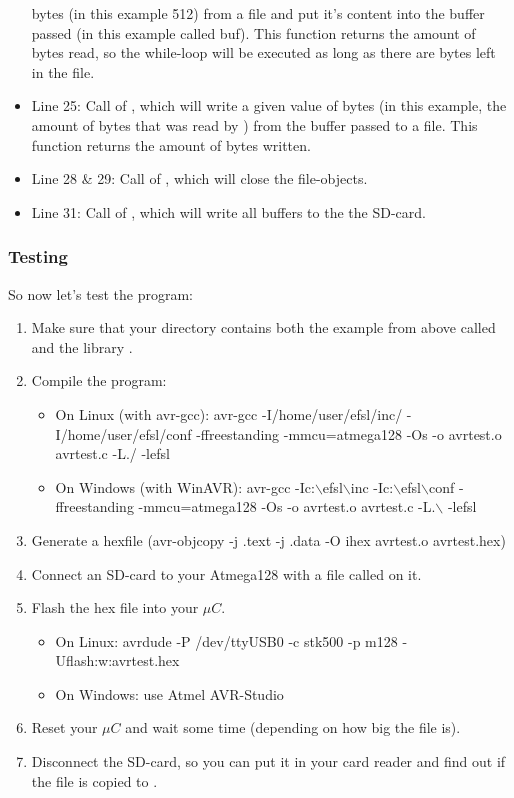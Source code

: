 \begin{itemize}
{		bytes (in this example 512) from a file and put it's content into
		the buffer passed (in this example called buf). This function returns
		the amount of bytes read, so the while-loop will be executed as long
		as there are bytes left in the file.}
	\item{Line 25: Call of , which will write a given value
		of bytes (in this example, the amount of bytes that was read
		by ) from the buffer passed to a file. This function returns
		the amount of bytes written.}
	\item{Line 28 \& 29: Call of , which will close the
		file-objects.}
	\item{Line 31: Call of , which will write all buffers to
		the the SD-card.}
\end{itemize}
\subsubsection{Testing}
So now let's test the program:
\begin{enumerate}
	\item
	{
		Make sure that your directory contains both the example from above
		called  and the library .
	}
	\item
	{	Compile the program:
		\begin{itemize}
			\item{On Linux (with avr-gcc): avr-gcc -I/home/user/efsl/inc/
				-I/home/user/efsl/conf -ffreestanding -mmcu=atmega128 -Os -o
				avrtest.o avrtest.c -L./ -lefsl}
			\item{On Windows (with WinAVR): avr-gcc
				-Ic:$\backslash$efsl$\backslash$inc
				-Ic:$\backslash$efsl$\backslash$conf
				-ffreestanding -mmcu=atmega128 -Os -o
				avrtest.o avrtest.c -L.$\backslash$ -lefsl}
		\end{itemize}
	}
	\item{Generate a hexfile
		(avr-objcopy -j .text -j .data -O ihex avrtest.o avrtest.hex)}
	\item{Connect an SD-card to your Atmega128 with a file called
		 on it.}
	\item
	{
		Flash the hex file into your $\mu C$.
		\begin{itemize}
			\item{On Linux: avrdude -P /dev/ttyUSB0 -c stk500 -p m128 -Uflash:w:avrtest.hex}
			\item{On Windows: use Atmel AVR-Studio}
		\end{itemize}
	}
	\item{Reset your $\mu C$ and wait some time (depending on how big
		the file  is).}
	\item{Disconnect the SD-card, so you can put it in your card reader
		and find out if the file  is copied to
		.}
\end{enumerate}
